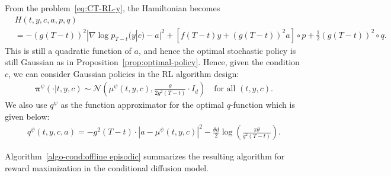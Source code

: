 \documentclass[11pt]{article}
\newcommand{\bpi}{\boldsymbol{\pi}}
\begin{document}
From the problem~\eqref{eq:CT-RL-y}, the Hamiltonian becomes
\begin{align*}%
&H(t, y, c, a, p,q) \nonumber \\
&=   -(g(T-t))^{2}  | \nabla\log p_{T-t}(y|c) - a|^2  +  [f(T-t) y +(g(T-t))^{2} a ] \circ p + \frac{1}{2}(g(T-t))^{2} \circ  q.
\end{align*}
This is still a quadratic function of $a$, and hence the optimal stochastic policy is still Gaussian as in Proposition~\ref{prop:optimal-policy}.
Hence, given the condition $c$, we can consider Gaussian policies in the RL algorithm design:
\begin{align}\label{eq:pi-psi-y}
\bpi^{\psi}(\cdot|t, y, c )   \sim  \mathcal{N}\left(\mu^{\psi}(t, y, c), \frac{\theta}{2 g^2(T-t)}  \cdot I_{d} \right) \quad \text{for all $(t, y, c)$.}%
\end{align}
We also use $q^{\psi}$ as the function approximator for the optimal $q$-function which is given below:
 \begin{align}\label{eq:q-psi-y}
q^{\psi}(t, y, c, a) = - g^2(T-t) \cdot |a - \mu^{\psi}(t,y, c)|^2 - \frac{\theta d}{2} \log \left(\frac{\pi\theta}{g^2(T-t)} \right).
\end{align}

Algorithm~\ref{algo-cond:offline episodic} summarizes the resulting algorithm for reward maximization in the conditional diffusion model.
\end{document}
